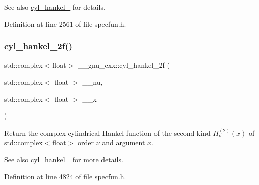 \begin{DoxySeeAlso}{See also}
\hyperlink{group__gnu__math__spec__func_ga7ebc71dd48ac97255d72f5f5f43dfd8e}{cyl\+\_\+hankel\+\_} for details. 
\end{DoxySeeAlso}


Definition at line 2561 of file specfun.\+h.

\mbox{\label{group__gnu__math__spec__func_gae21f9d09b937eaf9729982da5a382f20}} 
\subsubsection{\texorpdfstring{cyl\+\_\+hankel\+\_\+2f()}{cyl\_hankel\_2f()}\hspace{0.1cm}{\footnotesize\ttfamily [2/2]}}
{\footnotesize\ttfamily std\+::complex$<$float$>$ \+\_\+\+\_\+gnu\+\_\+cxx\+::cyl\+\_\+hankel\+\_\+2f (\begin{DoxyParamCaption}\item[{std\+::complex$<$ float $>$}]{\+\_\+\+\_\+nu,  }\item[{std\+::complex$<$ float $>$}]{\+\_\+\+\_\+x }\end{DoxyParamCaption})\hspace{0.3cm}{\ttfamily [inline]}}

Return the complex cylindrical Hankel function of the second kind $ H^{(2)}_\nu(x) $ of {\ttfamily std\+::complex$<$float$>$} order $ \nu $ and argument $ x $.

\begin{DoxySeeAlso}{See also}
\hyperlink{group__gnu__math__spec__func_ga7ebc71dd48ac97255d72f5f5f43dfd8e}{cyl\+\_\+hankel\+\_} for more details. 
\end{DoxySeeAlso}


Definition at line 4824 of file specfun.\+h.

\mbox{\label{group__gnu__math__spec__func_ga4babb91ca6906f237e8bd1f0f1a10509}} 
